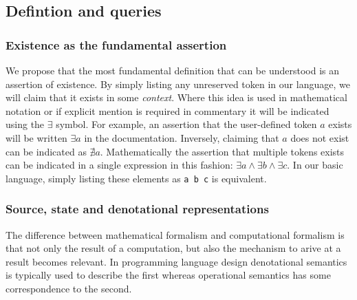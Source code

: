 \documentclass[11pt]{article}
\begin{document}
\subsection{Defintion and queries}
\subsubsection{Existence as the fundamental assertion}
We propose that the most fundamental definition that can be understood is an assertion of existence. 
By simply listing any unreserved token in our language, we will claim that it exists in some \emph{context}.
Where this idea is used in mathematical notation or if explicit mention is required in commentary it will be indicated using the $\exists$ symbol.
For example, an assertion that the user-defined token $a$ exists will be written $\exists a$ in the documentation.
Inversely, claiming that $a$ does not exist can be indicated as $\nexists a$.
Mathematically the assertion that multiple tokens exists can be indicated in a single expression in this fashion: $\exists a \land \exists b \land \exists c$.
In our basic language, simply listing these elements as \texttt{a b c} is equivalent.



\subsubsection{Source, state and denotational representations}
The difference between mathematical formalism and computational formalism is that not only the result of a computation, but also the mechanism to arive at a result becomes relevant.
In programming language design denotational semantics is typically used to describe the first whereas operational semantics has some correspondence to the second.
\end{document}
